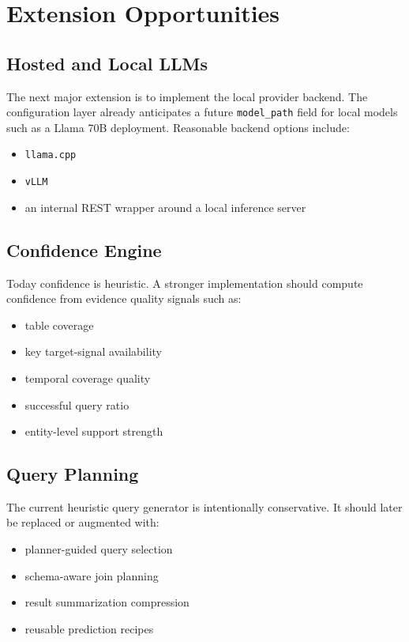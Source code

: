 \documentclass[11pt]{book}
\begin{document}
\chapter{Extension Opportunities}
\section{Hosted and Local LLMs}
The next major extension is to implement the local provider backend. The configuration layer already
anticipates a future \texttt{model\_path} field for local models such as a Llama 70B deployment.
Reasonable backend options include:

\begin{itemize}
\item \texttt{llama.cpp}
\item \texttt{vLLM}
\item an internal REST wrapper around a local inference server
\end{itemize}

\section{Confidence Engine}
Today confidence is heuristic. A stronger implementation should compute confidence from evidence
quality signals such as:

\begin{itemize}
\item table coverage
\item key target-signal availability
\item temporal coverage quality
\item successful query ratio
\item entity-level support strength
\end{itemize}

\section{Query Planning}
The current heuristic query generator is intentionally conservative. It should later be replaced or
augmented with:

\begin{itemize}
\item planner-guided query selection
\item schema-aware join planning
\item result summarization compression
\item reusable prediction recipes
\end{itemize}
\end{document}
